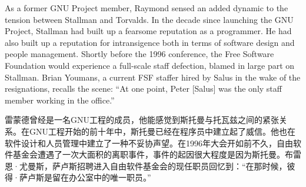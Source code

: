 \ifdefined\eng
As a former GNU Project member, Raymond sensed an added dynamic to the tension between Stallman and Torvalds. In the decade since launching the GNU Project, Stallman had built up a fearsome reputation as a programmer. He had also built up a reputation for intransigence both in terms of software design and people management. Shortly before the 1996 conference, the Free Software Foundation would experience a full-scale staff defection, blamed in large part on Stallman. Brian Youmans, a current FSF staffer hired by Salus in the wake of the resignations, recalls the scene: ``At one point, Peter [Salus] was the only staff member working in the office.''
\fi

\ifdefined\chs
雷蒙德曾经是一名GNU工程的成员，他能感觉到斯托曼与托瓦兹之间的紧张关系。在GNU工程开始的前十年中，斯托曼已经在程序员中建立起了威信。他也在软件设计和人员管理中建立了一种不妥协声望。在1996年大会开如前不久，自由软件基金会遭遇了一次大面积的离职事件，事件的起因很大程度是因为斯托曼。布雷恩·尤曼斯，萨卢斯招聘进入自由软件基金会的现任职员回忆到：``在那时候，彼得·萨卢斯是留在办公室中的唯一职员。''
\fi






